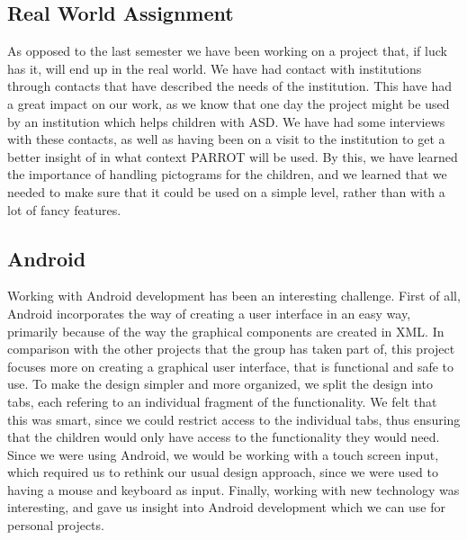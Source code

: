 \subsection*{Real World Assignment}
As opposed to the last semester we have been working on a project that, if luck has it, will end up in the real world.\newline
We have had contact with institutions through contacts that have described the needs of the institution.\newline
This have had a great impact on our work, as we know that one day the project might be used by an institution which helps children with ASD. 
We have had some interviews with these contacts, as well as having been on a visit to the institution to get a better insight of in what context PARROT will be used. 
By this, we have learned the importance of handling pictograms for the children, and we learned that we needed to make sure that it could be used on a simple level, rather than with a lot of fancy features. 



\subsection*{Android}
Working with Android development has been an interesting challenge. First of all, Android incorporates the way of creating a user interface in an easy way, primarily because of the way the graphical components are created in XML.\newline
In comparison with the other projects that the group has taken part of, this project focuses more on creating a graphical user interface, that is functional and safe to use.\newline
To make the design simpler and more organized, we split the design into tabs, each refering to an individual fragment of the functionality. We felt that this was smart, since we could restrict access to the individual tabs, thus ensuring that the children would only have access to the functionality they would need.\newline
Since we were using Android, we would be working with a touch screen input, which required us to rethink our usual design approach, since we were used to having a mouse and keyboard as input.\newline
Finally, working with new technology was interesting, and gave us insight into Android development which we can use for personal projects.\newline

